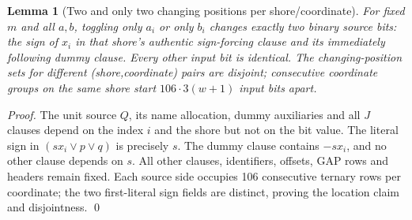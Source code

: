 \documentclass[11pt]{article}
\newtheorem{lemma}[theorem]{Lemma}
\begin{document}
\begin{lemma}[Two and only two changing positions per shore/coordinate]
\label{lem:locality}
For fixed $m$ and all $a,b$, toggling only $a_i$ or only $b_i$
changes exactly two binary source bits: the sign of $x_i$ in that shore's
authentic sign-forcing clause and its immediately following dummy clause.
Every other input bit is identical. The changing-position sets for
different (shore,coordinate) pairs are disjoint; consecutive coordinate
groups on the same shore start $106\cdot3(w+1)$ input bits apart.
\end{lemma}
\begin{proof}
The unit source $Q$, its name allocation, dummy auxiliaries and all $J$
clauses depend on the index $i$ and the shore but not on the bit value.
The literal sign in $(s x_i\vee p\vee q)$ is precisely $s$.
The dummy clause contains $-s x_i$, and no other clause depends on $s$.
All other clauses, identifiers, offsets, GAP rows and headers remain fixed.
Each source side occupies 106 consecutive ternary rows per coordinate;
the two first-literal sign fields are distinct, proving the location
claim and disjointness. \qed
\end{proof}
\end{document}
